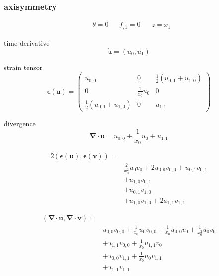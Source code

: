\documentclass{scrartcl}
\newcommand{\vect}[1]{\boldsymbol{#1}}
\newcommand{\ten}[1]{\boldsymbol{#1}}
\begin{document}
\subsubsection{axisymmetry}

\begin{align*}
&\theta = 0 & &f_{,1} = 0 & & z = x_1
\end{align*}

time derivative
\[
\dot{\vect{u}} = ( \dot{u}_0, \dot{u}_1 )
\]

strain tensor
\[
\ten{\epsilon}(\vect{u}) = 
\begin{pmatrix}
u_{0,0} & 0 & \frac{1}{2}(u_{0,1} + u_{1,0}) \\
0 & \frac{1}{x_0}u_0 & 0 \\
\frac{1}{2}(u_{0,1} + u_{1,0}) & 0 & u_{1,1} 
\end{pmatrix}
\]

divergence
\[
\vect{\nabla} \cdot \vect{u} = u_{0,0} + \frac{1}{x_0}u_0 + u_{1,1}
\]

\begin{align*}
2(\ten{\epsilon}(\vect{u}), \ten{\epsilon}(\vect{v})) =& \\
&\frac{2}{x_0^2}u_0 v_0 + 2 u_{0,0} v_{0,0} + u_{0,1} v_{0,1} \\
&+ u_{1,0} v_{0,1} \\
&+ u_{0,1} v_{1,0} \\
&+ u_{1,0} v_{1,0} + 2 u_{1,1} v_{1,1}
\end{align*}

\begin{align*}
(\vect{\nabla} \cdot \vect{u}, \vect{\nabla} \cdot \vect{v}) =& \\
& u_{0,0} v_{0,0} + \frac{1}{x_0} u_0 v_{0,0} 
+ \frac{1}{x_0} u_{0,0} v_0 + \frac{1}{x_0^2} u_0 v_0 \\
&+ u_{1,1} v_{0,0} + \frac{1}{x_0} u_{1,1} v_0 \\
&+ u_{0,0} v_{1,1} + \frac{1}{x_0} u_0 v_{1,1} \\
&+ u_{1,1} v_{1,1}
\end{align*}
\end{document}
